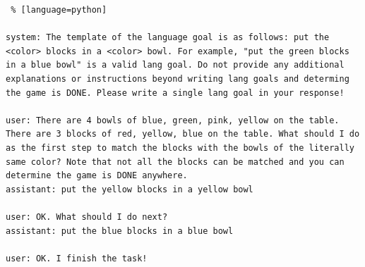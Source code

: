 
\begin{lstlisting} % [language=python] 

system: The template of the language goal is as follows: put the <color> blocks in a <color> bowl. For example, "put the green blocks in a blue bowl" is a valid lang goal. Do not provide any additional explanations or instructions beyond writing lang goals and determing the game is DONE. Please write a single lang goal in your response!

user: There are 4 bowls of blue, green, pink, yellow on the table. There are 3 blocks of red, yellow, blue on the table. What should I do as the first step to match the blocks with the bowls of the literally same color? Note that not all the blocks can be matched and you can determine the game is DONE anywhere.
assistant: put the yellow blocks in a yellow bowl

user: OK. What should I do next?
assistant: put the blue blocks in a blue bowl

user: OK. I finish the task!
\end{lstlisting}

